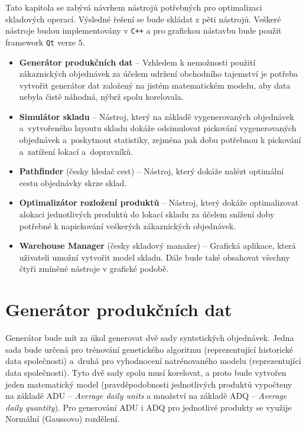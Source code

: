 Tato kapitola se zabývá návrhem nástrojů potřebných pro optimalizaci skladových operací. Výsledné řešení se bude skládat z pěti  nástrojů. Veškeré nástroje budou implementovány v \texttt{C++} a pro grafickou nástavbu bude použit framework \texttt{Qt} verze $5$.

\begin{itemize}
    \item \textbf{Generátor produkčních dat} -- Vzhledem k nemožnosti použití zákaznických objednávek za účelem udržení obchodního tajemství je potřeba vytvořit generátor dat založený na jistém matematickém modelu, aby data nebyla čistě náhodná, nýbrž spolu korelovala.
    \item \textbf{Simulátor skladu} -- Nástroj, který na základě vygenerovaných objednávek a~vytvořeného layoutu skladu dokáže odsimulovat pickování vygenerovaných objednávek a~poskytnout statistiky, zejména pak dobu potřebnou k pickování a~zatížení lokací a~dopravníků.
    \item \textbf{Pathfinder} (česky hledač cest) -- Nástroj, který dokáže nalézt optimální cestu objednávky skrze sklad.
    \item \textbf{Optimalizátor rozložení produktů} -- Nástroj, který dokáže optimalizovat alokaci jednotlivých produktů do lokací skladu za účelem snížení doby potřebné k napickování veškerých zákaznických objednávek.
    \item \textbf{Warehouse Manager} (česky skladový manažer) -- Grafická aplikace, která uživateli umožní vytvořit model skladu. Dále bude také obsahovat všechny čtyři zmíněné nástroje v grafické podobě.
\end{itemize}

\section{Generátor produkčních dat}
\label{navrhGenerator}
Generátor bude mít za úkol generovat dvě sady syntetických objednávek. Jedna sada bude určená pro trénování genetického algoritmu (reprezentující historické data společnosti) a~druhá pro vyhodnocení natrénovaného modelu (reprezentující  data společnosti). Tyto dvě sady spolu musí korelovat, a proto bude vytvořen jeden matematický model (pravděpodobnosti jednotlivých produktů vypočteny na základě ADU -- \emph{Average daily units} a množství na základě ADQ -- \emph{Average daily quantity}). Pro generování ADU i ADQ pro jednotlivé produkty se využije Normální (Gaussovo) rozdělení.

